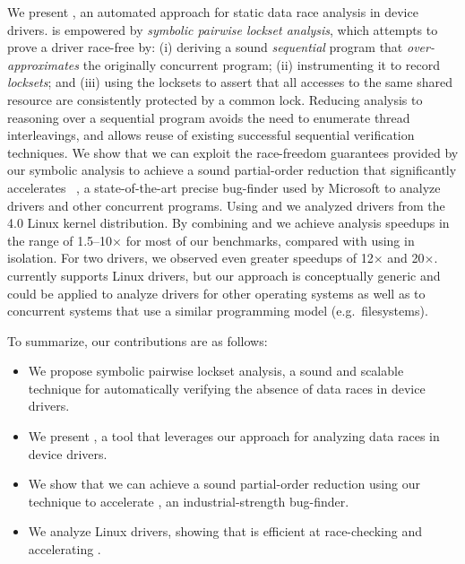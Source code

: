 We present \whoop, an automated approach for static data race analysis in device drivers. \whoop is empowered by \emph{symbolic pairwise lockset analysis}, which attempts to prove a driver race-free by: (i) deriving a sound \emph{sequential} program that \emph{over-approximates} the originally concurrent program; (ii) instrumenting it to record \emph{locksets}; and (iii) using the locksets to assert that all accesses to the same shared resource are consistently protected by a common lock. Reducing analysis to reasoning over a sequential program avoids the need to enumerate thread interleavings, and allows reuse of existing successful sequential verification techniques.
%
We show that we can exploit the race-freedom guarantees provided by our symbolic analysis to achieve a sound partial-order reduction that significantly accelerates \corral~\cite{lal2012corral}, a state-of-the-art precise bug-finder used by Microsoft to analyze drivers and other concurrent programs. Using \whoop and \corral we analyzed \sizeOfBenchmarks drivers from the 4.0 Linux kernel distribution.  By combining \whoop and \corral we achieve analysis speedups in the range of 1.5--10$\times$ for most of our benchmarks, compared with using \corral in isolation.  For two drivers, we observed even greater speedups of 12$\times$ and 20$\times$.
%
\whoop currently supports Linux drivers, but our approach is conceptually generic and could be applied to analyze drivers for other operating systems as well as to concurrent systems that use a similar programming model (e.g.\ filesystems).

To summarize, our contributions are as follows:
\vspace{-0.5mm}
\begin{itemize}
\item We propose symbolic pairwise lockset analysis, a sound and scalable technique for automatically verifying the absence of data races in device drivers.
\vspace{-0.2mm}
\item We present \whoop, a tool that leverages our approach for analyzing data races in device drivers.
\vspace{-0.2mm}
\item We show that we can achieve a sound partial-order reduction using our technique to accelerate \corral, an industrial-strength bug-finder.
\vspace{-0.2mm}
\item We analyze \sizeOfBenchmarks Linux drivers, showing that \whoop is efficient at race-checking and accelerating \corral.
\end{itemize}
